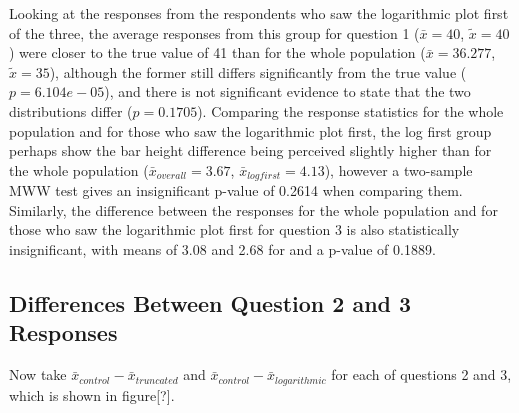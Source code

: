 \documentclass[
]{article}
\begin{document}
Looking at the responses from the respondents who saw the logarithmic
plot first of the three, the average responses from this group for
question 1 (\(\bar{x}=40\), \(\tilde{x}=40\)) were closer to the true
value of 41 than for the whole population (\(\bar{x}=36.277\),
\(\tilde{x}=35\)), although the former still differs significantly from
the true value (\(p=6.104e-05\)), and there is not significant evidence
to state that the two distributions differ (\(p=0.1705\)). Comparing the
response statistics for the whole population and for those who saw the
logarithmic plot first, the log first group perhaps show the bar height
difference being perceived slightly higher than for the whole population
(\(\bar{x}_{overall}=3.67\), \(\bar{x}_{logfirst} = 4.13\)), however a
two-sample MWW test gives an insignificant p-value of 0.2614 when
comparing them. Similarly, the difference between the responses for the
whole population and for those who saw the logarithmic plot first for
question 3 is also statistically insignificant, with means of 3.08 and
2.68 for and a p-value of 0.1889.

\subsection{Differences Between Question 2 and 3 Responses}

Now take \(\bar{x}_{control} - \bar{x}_{truncated}\) and
\(\bar{x}_{control} - \bar{x}_{logarithmic}\) for each of questions 2
and 3, which is shown in figure{[}?{]}.
\end{document}
